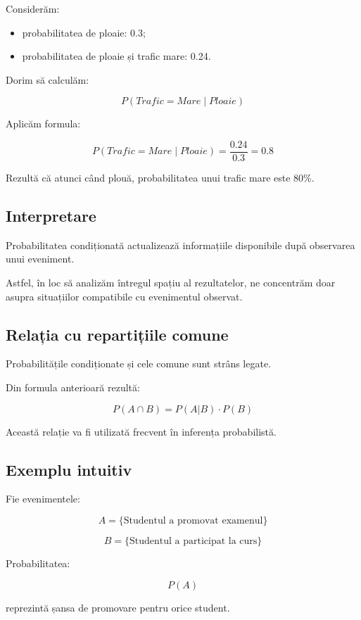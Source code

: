 \documentclass[12pt,a4paper]{article}
\begin{document}
Considerăm:

\begin{itemize}
\item probabilitatea de ploaie: 0.3;
\item probabilitatea de ploaie și trafic mare: 0.24.
\end{itemize}

Dorim să calculăm:

\[
P(Trafic=Mare \mid Ploaie)
\]

Aplicăm formula:

\[
P(Trafic=Mare \mid Ploaie)
=
\frac{0.24}{0.3}
=
0.8
\]

Rezultă că atunci când plouă, probabilitatea unui trafic mare este 80\%.

\subsection{Interpretare}

Probabilitatea condiționată actualizează informațiile disponibile după observarea unui eveniment.

Astfel, în loc să analizăm întregul spațiu al rezultatelor, ne concentrăm doar asupra situațiilor compatibile cu evenimentul observat.

\subsection{Relația cu repartițiile comune}

Probabilitățile condiționate și cele comune sunt strâns legate.

Din formula anterioară rezultă:

\[
P(A \cap B)
=
P(A|B)\cdot P(B)
\]

Această relație va fi utilizată frecvent în inferența probabilistă.

\subsection{Exemplu intuitiv}

Fie evenimentele:

\[ A = \{\mbox{Studentul a promovat examenul}\} \] 

\[ B = \{\mbox{Studentul a participat la curs}\} \]

Probabilitatea:

\[
P(A)
\]

reprezintă șansa de promovare pentru orice student.
\end{document}

